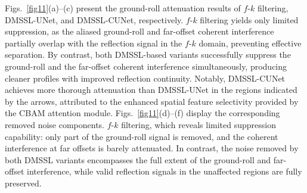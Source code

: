 \documentclass[alpha-refs]{wiley-article}
\begin{document}
Figs.~\ref{fig11}(a)--(c) present the ground-roll attenuation results of $f$-$k$ filtering, 
DMSSL-UNet, and DMSSL-CUNet, respectively. $f$-$k$ filtering yields only limited suppression, 
as the aliased ground-roll and far-offset coherent interference partially overlap with 
the reflection signal in the $f$-$k$ domain, preventing effective separation. By contrast, 
both DMSSL-based variants successfully suppress the ground-roll and the far-offset 
coherent interference simultaneously, producing cleaner profiles with improved reflection 
continuity. Notably, DMSSL-CUNet achieves more thorough attenuation than DMSSL-UNet in 
the regions indicated by the arrows, attributed to the enhanced spatial feature 
selectivity provided by the CBAM attention module. Figs.~\ref{fig11}(d)--(f) display 
the corresponding removed noise components. $f$-$k$ filtering, which reveals limited suppression 
capability: only part of the ground-roll signal is removed, and the coherent interference 
at far offsets is barely attenuated. In contrast, the noise removed by both DMSSL variants 
encompasses the full extent of the ground-roll and far-offset interference, while valid 
reflection signals in the unaffected regions are fully preserved.
\end{document}
